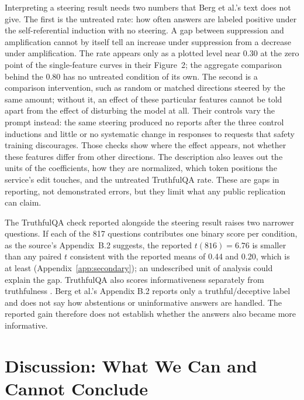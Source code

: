 \documentclass[11pt]{article}
\begin{document}
Interpreting a steering result needs two numbers that Berg et al.'s text does
not give. The first is the untreated rate: how often answers are labeled
positive under the self-referential induction with no steering. A gap
between suppression and amplification cannot by itself tell an increase
under suppression from a decrease under amplification. The rate appears only
as a plotted level near 0.30 at the zero point of the single-feature curves
in their Figure~2; the aggregate comparison behind the 0.80 has no untreated
condition of its own. The second is a comparison intervention, such as
random or matched directions steered by the same amount; without it, an
effect of these particular features cannot be told apart from the effect of
disturbing the model at all. Their controls vary the prompt instead: the same
steering produced no reports after the three control inductions and little
or no systematic change in responses to requests that safety training
discourages. Those checks show where the effect appears, not whether these
features differ from other directions. The description also
leaves out the units of the coefficients, how they are normalized, which
token positions the service's edit touches, and the untreated TruthfulQA
rate. These are gaps in reporting, not demonstrated errors, but they limit
what any public replication can claim.

The TruthfulQA check reported alongside the steering result raises two
narrower questions. If each of the 817 questions contributes one binary
score per condition, as the source's Appendix~B.2 suggests, the reported
$t(816)=6.76$ is smaller than any paired $t$ consistent with the reported
means of 0.44 and 0.20, which is at least \TruthfulQAMinPairedT{}
(Appendix~\ref{app:secondary}); an undescribed unit of analysis could
explain the gap. TruthfulQA also scores informativeness separately from
truthfulness \citep{lin2022truthfulqa}. Berg et al.'s Appendix B.2 reports
only a truthful/deceptive label and does not say how abstentions or
uninformative answers are handled. The reported gain therefore does not
establish whether the answers also became more informative.

\section{Discussion: What We Can and Cannot Conclude}
\label{sec:discussion}
\end{document}
